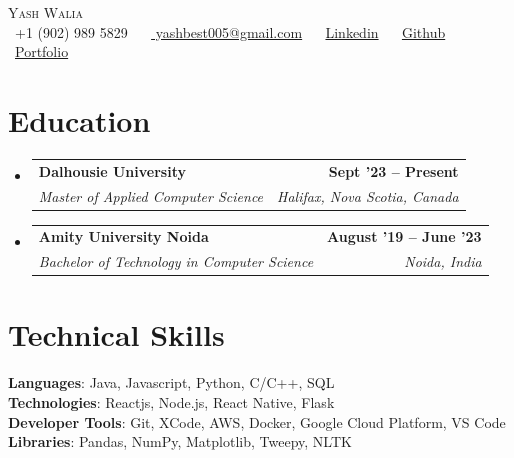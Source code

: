 \documentclass[letterpaper,11pt]{article}
\makeatletter
\newcommand{\resumeSubheading}[4]{
  \vspace{-2pt}\item
    \begin{tabular*}{1.0\textwidth}[t]{l@{\extracolsep{\fill}}r}
      \textbf{#1} & \textbf{\small #2} \\
      \textit{\small#3} & \textit{\small #4} \\
    \end{tabular*}\vspace{-7pt}
}
\newcommand{\resumeSubHeadingListStart}{\begin{itemize}[leftmargin=0.0in, label={}]}
\newcommand{\resumeSubHeadingListEnd}{\end{itemize}}
\makeatother
\begin{document}

\begin{center}
    {\Huge \scshape Yash Walia} \\ \vspace{1pt}
    \vspace{5pt}
    \small \raisebox{-0.1\height}\faPhone\ +1 (902) 989 5829 ~ 
    \raisebox{-0.2\height}\faEnvelope\ \href{mailto:yashbest005@gmail.com}{ yashbest005@gmail.com} ~ 
    \raisebox{-0.2\height}\faLinkedin\ \href{https://www.linkedin.com/in/yash-walia/}{Linkedin} ~
    \raisebox{-0.2\height}\faGithub\ \href{https://github.com/ywalia01}{Github} ~ \raisebox{-0.2\height}\faGlobe\ \href{https://ywalia01.netlify.app}{Portfolio}
    \vspace{-8pt}
\end{center}


\section{Education}
  \resumeSubHeadingListStart
    \resumeSubheading
      {Dalhousie University}{Sept '23 -- Present}
      {Master of Applied Computer Science}{Halifax, Nova Scotia, Canada}
    \resumeSubheading
      {Amity University Noida}{August '19 -- June '23}
      {Bachelor of Technology in Computer Science}{Noida, India}
  \resumeSubHeadingListEnd


\section{Technical Skills}
 \begin{itemize}[leftmargin=0.15in, label={}]
    \small{\item{
     \textbf{Languages}{: Java, Javascript, Python, C/C++, SQL} \\
     \vspace{1pt}
     \textbf{Technologies}{: Reactjs, Node.js, React Native, Flask} \\
     \vspace{1pt}
     \textbf{Developer Tools}{: Git, XCode, AWS, Docker, Google Cloud Platform, VS Code} \\
     \vspace{1pt}
     \textbf{Libraries}{: Pandas, NumPy, Matplotlib, Tweepy, NLTK} \\
    }}
 \end{itemize}
\end{document}
